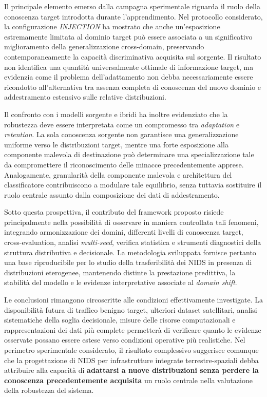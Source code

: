 Il principale elemento emerso dalla campagna sperimentale riguarda il ruolo della conoscenza target introdotta durante l'apprendimento.
Nel protocollo considerato, la configurazione \textit{INJECTION} ha mostrato che anche un'esposizione estremamente limitata al dominio target può essere associata a un significativo miglioramento della generalizzazione cross-domain, preservando contemporaneamente la capacità discriminativa acquisita sul sorgente.
Il risultato non identifica una quantità universalmente ottimale di informazione target, ma evidenzia come il problema dell'adattamento non debba necessariamente essere ricondotto all'alternativa tra assenza completa di conoscenza del nuovo dominio e addestramento estensivo sulle relative distribuzioni.

Il confronto con i modelli sorgente e ibridi ha inoltre evidenziato che la robustezza deve essere interpretata come un compromesso tra \textit{adaptation} e \textit{retention}.
La sola conoscenza sorgente non garantisce una generalizzazione uniforme verso le distribuzioni target, mentre una forte esposizione alla componente malevola di destinazione può determinare una specializzazione tale da compromettere il riconoscimento delle minacce precedentemente apprese.
Analogamente, granularità della componente malevola e architettura del classificatore contribuiscono a modulare tale equilibrio, senza tuttavia sostituire il ruolo centrale assunto dalla composizione dei dati di addestramento.

Sotto questa prospettiva, il contributo del framework proposto risiede principalmente nella possibilità di osservare in maniera controllata tali fenomeni, integrando armonizzazione dei domini, differenti livelli di conoscenza target, cross-evaluation, analisi \textit{multi-seed}, verifica statistica e strumenti diagnostici della struttura distributiva e decisionale.
La metodologia sviluppata fornisce pertanto una base riproducibile per lo studio della trasferibilità dei NIDS in presenza di distribuzioni eterogenee, mantenendo distinte la prestazione predittiva, la stabilità del modello e le evidenze interpretative associate al \textit{domain shift}.

Le conclusioni rimangono circoscritte alle condizioni effettivamente investigate.
La disponibilità futura di traffico benigno target, ulteriori dataset satellitari, analisi sistematiche della soglia decisionale, misure delle risorse computazionali e rappresentazioni dei dati più complete permetterà di verificare quanto le evidenze osservate possano essere estese verso condizioni operative più realistiche.
Nel perimetro sperimentale considerato, il risultato complessivo suggerisce comunque che la progettazione di NIDS per infrastrutture integrate terrestre-spaziali debba attribuire alla capacità di \textbf{adattarsi a nuove distribuzioni senza perdere la conoscenza precedentemente acquisita} un ruolo centrale nella valutazione della robustezza del sistema.

